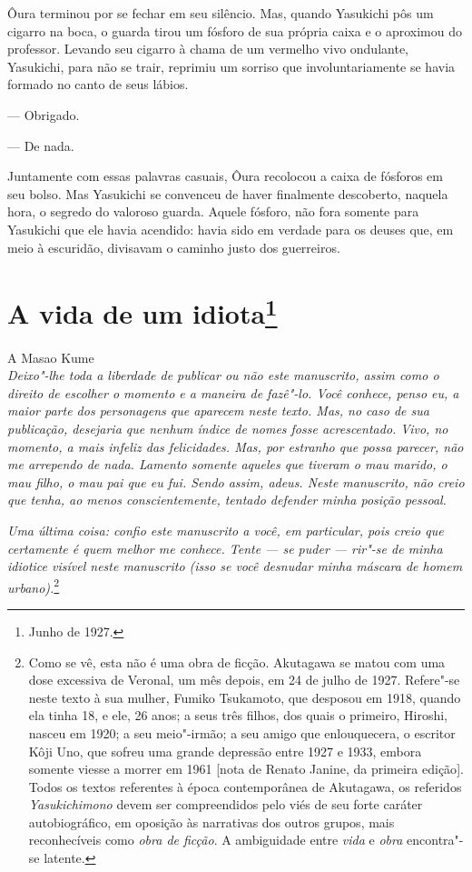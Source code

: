 Ôura terminou por se fechar em seu silêncio. Mas, quando Yasukichi pôs
um cigarro na boca, o guarda tirou um fósforo de sua própria caixa e o
aproximou do professor. Levando seu cigarro à chama de um vermelho vivo
ondulante, Yasukichi, para não se trair, reprimiu um sorriso que
involuntariamente se havia formado no canto de seus lábios.

--- Obrigado.

--- De nada.

Juntamente com essas palavras casuais, Ôura recolocou a caixa de
fósforos em seu bolso. Mas Yasukichi se convenceu de haver finalmente
descoberto, naquela hora, o segredo do valoroso guarda. Aquele fósforo,
não fora somente para Yasukichi que ele havia acendido: havia sido em
verdade para os deuses que, em meio à escuridão, divisavam o caminho
justo dos guerreiros.

\chapter{A vida de um idiota\footnote{Junho de 1927.}}


A Masao Kume\\

\noindent\textit{Deixo"-lhe toda a liberdade de publicar ou não este manuscrito, assim
como o direito de escolher o momento e a maneira de fazê"-lo. Você
conhece, penso eu, a maior parte dos personagens que aparecem neste
texto. Mas, no caso de sua publicação, desejaria que nenhum índice de
nomes fosse acrescentado. Vivo, no momento, a mais infeliz das
felicidades. Mas, por estranho que possa parecer, não me arrependo de
nada. Lamento somente aqueles que tiveram o mau marido, o mau filho, o
mau pai que eu fui. Sendo assim, adeus. Neste manuscrito, não creio que
tenha, ao menos conscientemente, tentado defender minha posição pessoal.}

\textit{Uma última coisa: confio este manuscrito a você, em particular, pois
creio que certamente é quem melhor me conhece. Tente --- se puder ---
rir"-se de minha idiotice visível neste manuscrito (isso se você
desnudar minha máscara de homem urbano).}\footnote{Como se vê, esta não é uma obra de ficção. Akutagawa se matou com uma dose excessiva de Veronal, um mês
depois, em 24 de julho de 1927. Refere"-se neste texto à sua mulher,
Fumiko Tsukamoto, que desposou em 1918, quando ela tinha 18, e ele,
26 anos; a seus três filhos, dos quais o primeiro, Hiroshi,
nasceu em 1920; a seu meio"-irmão; a seu amigo que enlouquecera, o escritor
Kôji Uno, que sofreu uma grande depressão entre 1927 e 1933, embora
somente viesse a morrer em 1961 {[}nota de Renato Janine, da primeira edição{]}.
Todos os textos referentes à época contemporânea de Akutagawa, os referidos
\textit{Yasukichimono} devem ser compreendidos pelo viés de seu forte caráter
autobiográfico, em oposição às narrativas dos outros grupos, mais
reconhecíveis como \textit{obra de ficção}. A ambiguidade entre \textit{vida} e
\textit{obra} encontra"-se latente.}

